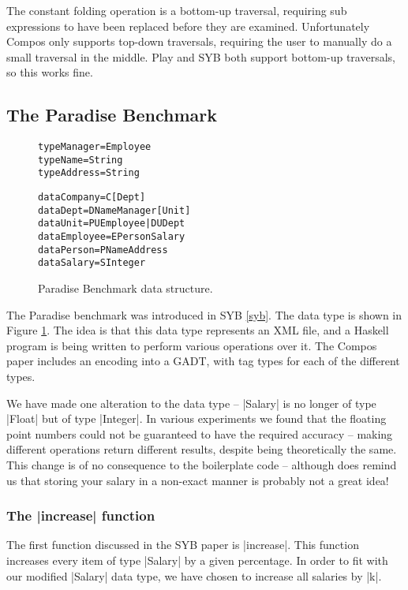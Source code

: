\documentclass[preprint]{sigplanconf}
\newenvironment{code}{\begin{alltt}\small}{\end{alltt}}
\begin{document}
The constant folding operation is a bottom-up traversal, requiring sub expressions to have been replaced before they are examined. Unfortunately Compos only supports top-down traversals, requiring the user to manually do a small traversal in the middle. Play and SYB both support bottom-up traversals, so this works fine.


\subsection{The Paradise Benchmark}

\begin{figure}
\begin{code}
type Manager  = Employee
type Name     = String
type Address  = String

data Company   = C [Dept]
data Dept      = D Name Manager [Unit]
data Unit      = PU Employee | DU Dept
data Employee  = E Person Salary
data Person    = P Name Address
data Salary    = S Integer
\end{code}
\caption{Paradise Benchmark data structure.}
\label{fig:paradise}
\end{figure}

The Paradise benchmark was introduced in SYB \ref{syb}. The data type is shown in Figure \ref{fig:paradise}. The idea is that this data type represents an XML file, and a Haskell program is being written to perform various operations over it. The Compos paper includes an encoding into a GADT, with tag types for each of the different types.

We have made one alteration to the data type -- |Salary| is no longer of type |Float| but of type |Integer|. In various experiments we found that the floating point numbers could not be guaranteed to have the required accuracy -- making different operations return different results, despite being theoretically the same. This change is of no consequence to the boilerplate code -- although does remind us that storing your salary in a non-exact manner is probably not a great idea!

\subsubsection{The |increase| function}

The first function discussed in the SYB paper is |increase|. This function increases every item of type |Salary| by a given percentage. In order to fit with our modified |Salary| data type, we have chosen to increase all salaries by |k|.
\end{document}
